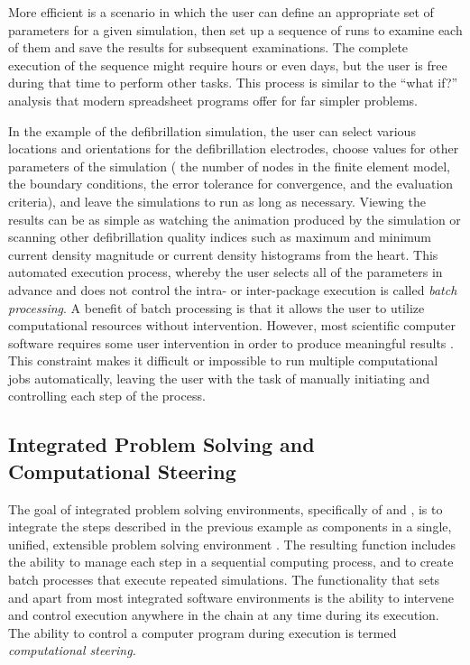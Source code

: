 More efficient is a scenario in which the user can define an
appropriate set of parameters for a given simulation, then set up
a sequence of runs to examine each of them and save the results for
subsequent examinations.  The complete execution of the sequence might
require hours or even days, but the user is free during that
time to perform other tasks.  This process is similar to the ``what
if?'' analysis that modern spreadsheet programs offer for far simpler
problems.  

In the example of the defibrillation simulation, the user can
select various locations and orientations for the defibrillation
electrodes, choose values for other parameters of the simulation
(\eg{} the number of nodes in the finite element model, the boundary
conditions, the error tolerance for convergence, and the evaluation
criteria), and leave the simulations to run as long as necessary.
Viewing the results can be as simple as watching the animation
produced by the simulation or scanning other defibrillation quality
indices such as maximum and minimum current density magnitude or
current density histograms from the heart.  This automated execution
process, whereby the user selects all of the parameters in advance and
does not control the intra- or inter-package execution is called
\emph{batch processing}.  A benefit of batch processing is
that it allows the user to utilize computational resources
without intervention.  However, most scientific computer software
 requires some user intervention in order to
produce meaningful results .  This constraint makes it difficult or
impossible to run multiple computational jobs automatically, leaving
the user with the task of manually initiating and controlling each
step of the process.

\subsection{Integrated Problem Solving and Computational Steering} 
\label{sec:con-steering} 

The goal of integrated problem solving environments, specifically
of \SR{} and \BIOPSE{}, is to integrate the steps
described in the previous example as components in a single, unified,
extensible problem solving environment .  The resulting function
includes the ability to manage each step in a
sequential computing process, and to create batch processes that
execute repeated simulations. The functionality that sets
\SR{} and \BIOPSE{} apart from most integrated software environments
is the ability to intervene and control execution anywhere in the
chain at any time during its execution.  The ability to control a
computer program during execution is termed \emph{computational
  steering.}

